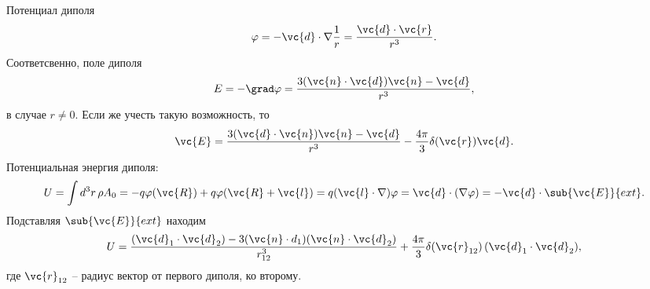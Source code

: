 
Потенциал диполя
\begin{equation*}
    \varphi = - \vc{d} \cdot \nabla \frac{1}{r} = \frac{\vc{d} \cdot \vc{r}}{r^3}.
\end{equation*}
Соответсвенно, поле диполя
\begin{equation*}
    E = - \grad \varphi = \frac{3 (\vc{n} \cdot \vc{d}) \vc{n} - \vc{d}}{r^3},
\end{equation*}
в случае $r \neq 0$. Если же учесть такую возможность, то
\begin{equation*}
    \vc{E} = \frac{3 (\vc{d} \cdot \vc{n})\vc{n}-\vc{d}}{r^3} - \frac{4\pi}{3} \delta(\vc{r}) \vc{d}.
\end{equation*}
Потенциальная энергия диполя:
\begin{equation*}
    U = \int d^3 r\, \rho A_0 = - q \varphi(\vc{R}) + q \varphi(\vc{R}+\vc{l}) = q (\vc{l} \cdot \nabla)\varphi = \vc{d} \cdot (\nabla \varphi) = - \vc{d} \cdot \sub{\vc{E}}{ext}.
\end{equation*}
Подставляя $\sub{\vc{E}}{ext}$ находим
\begin{equation*}
    U = \frac{(\vc{d}_1 \cdot \vc{d}_2)-3(\vc{n} \cdot d_1)(\vc{n} \cdot \vc{d}_2)}{r_{12}^{3}} + \frac{4\pi}{3} \delta(\vc{r}_{12}) \, (\vc{d}_1 \cdot \vc{d}_2),
\end{equation*}
где $\vc{r}_{12}$ -- радиус вектор от первого диполя, ко второму.

